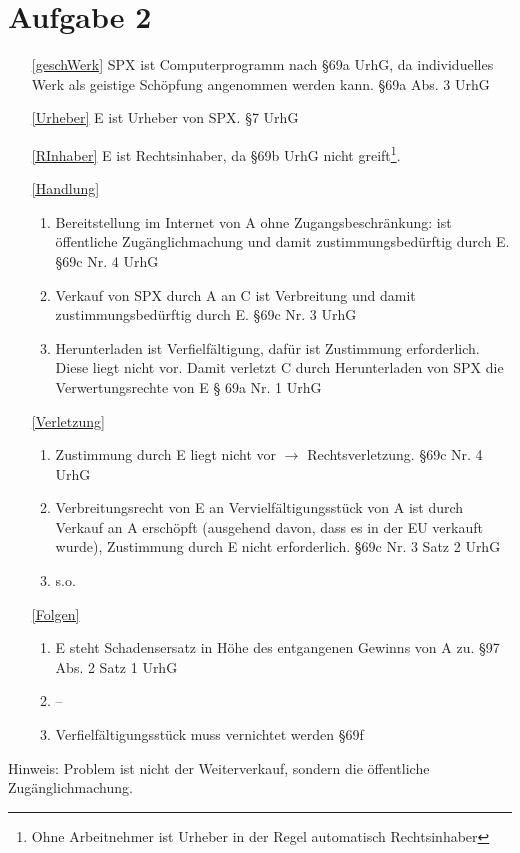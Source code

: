 \documentclass{scrreprt}
\begin{document}
\chapter{Aufgabe 2}
\begin{enumerate}
\item[\ref{geschWerk}] SPX ist Computerprogramm nach §69a UrhG, da individuelles Werk als geistige Schöpfung angenommen werden kann. \hfill §69a Abs. 3 UrhG
\item[\ref{Urheber}] E ist Urheber von SPX. \hfill §7 UrhG
\item[\ref{RInhaber}] E ist Rechtsinhaber, da §69b UrhG nicht greift\footnote{Ohne Arbeitnehmer ist Urheber in der Regel automatisch Rechtsinhaber}.
\item[\ref{Handlung}] 
\begin{enumerate}
\item Bereitstellung im Internet von A ohne Zugangsbeschränkung: ist öffentliche Zugänglichmachung und damit zustimmungsbedürftig durch E. \hfill §69c Nr. 4 UrhG
\item Verkauf von SPX durch A an C ist Verbreitung und damit zustimmungsbedürftig durch E. \hfill §69c Nr. 3 UrhG
\item Herunterladen ist Verfielfältigung, dafür ist Zustimmung erforderlich. Diese liegt nicht vor. Damit verletzt C durch Herunterladen von SPX die Verwertungsrechte von E \hfill § 69a Nr. 1 UrhG
\end{enumerate}
\item[\ref{Verletzung}] 
\begin{enumerate}
\item Zustimmung durch E liegt nicht vor $\to$ Rechtsverletzung.  \hfill §69c Nr. 4 UrhG
\item Verbreitungsrecht von E an Vervielfältigungsstück von A ist durch Verkauf an A erschöpft (ausgehend davon, dass es in der EU verkauft wurde), Zustimmung durch E nicht erforderlich. \hfill §69c Nr. 3 Satz 2 UrhG
\item s.o.
\end{enumerate}
\item[\ref{Folgen}] \begin{enumerate}
\item E steht Schadensersatz in Höhe des entgangenen Gewinns von A zu. \hfill §97 Abs. 2 Satz 1 UrhG
\item --
\item Verfielfältigungsstück muss vernichtet werden \hfill §69f
\end{enumerate}
\end{enumerate}
Hinweis: Problem ist nicht der Weiterverkauf, sondern die öffentliche Zugänglichmachung.
\end{document}
